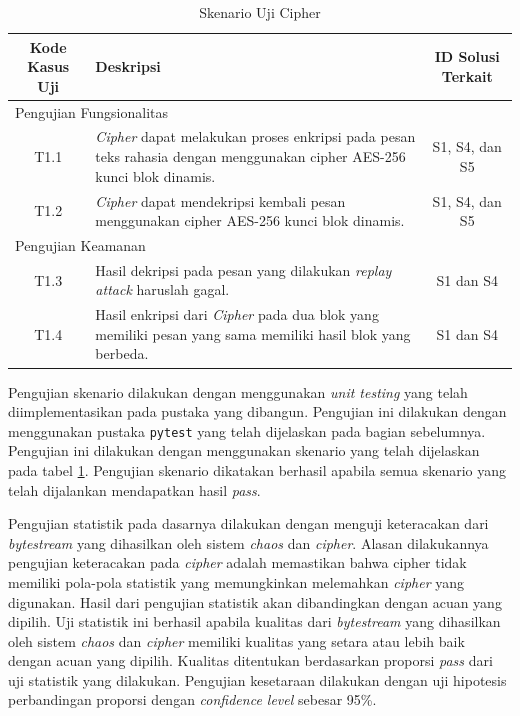 \begin{table}[!h]
  \centering
  \caption{Skenario Uji Cipher} \label{tab:test.case.cipher}
  \begin{tabular}{|c|p{7cm}|c|}
    \hline
    \textbf{Kode Kasus Uji} & \textbf{Deskripsi} & \textbf{ID Solusi Terkait} \\ \hline
    \multicolumn{3}{|l|}{Pengujian Fungsionalitas} \\ \hline
    T1.1 & \emph{Cipher} dapat melakukan proses enkripsi pada pesan teks rahasia dengan menggunakan cipher AES-256 kunci blok dinamis.  & S1, S4, dan S5\\ \hline
    T1.2 & \emph{Cipher} dapat mendekripsi kembali pesan menggunakan cipher AES-256 kunci blok dinamis. & S1, S4, dan S5\\ \hline
    \multicolumn{3}{|l|}{Pengujian Keamanan} \\ \hline
    T1.3 & Hasil dekripsi pada pesan yang dilakukan \emph{replay attack} haruslah gagal. & S1 dan S4\\ \hline
    T1.4 & Hasil enkripsi dari \emph{Cipher} pada dua blok yang memiliki pesan yang sama memiliki hasil blok yang berbeda. & S1 dan S4\\ \hline
  \end{tabular}
\end{table}

Pengujian skenario dilakukan dengan menggunakan \emph{unit testing} yang telah diimplementasikan pada pustaka yang dibangun. Pengujian ini dilakukan dengan menggunakan pustaka \texttt{pytest} yang telah dijelaskan pada bagian sebelumnya. Pengujian ini dilakukan dengan menggunakan skenario yang telah dijelaskan pada tabel \ref{tab:test.case.cipher}. Pengujian skenario dikatakan berhasil apabila semua skenario yang telah dijalankan mendapatkan hasil \emph{pass}.

Pengujian statistik pada dasarnya dilakukan dengan menguji keteracakan dari \emph{bytestream} yang dihasilkan oleh sistem \emph{chaos} dan \emph{cipher}. Alasan dilakukannya pengujian keteracakan pada \emph{cipher} adalah memastikan bahwa cipher tidak memiliki pola-pola statistik yang memungkinkan melemahkan \emph{cipher} yang digunakan. Hasil dari pengujian statistik akan dibandingkan dengan acuan yang dipilih. Uji statistik ini berhasil apabila kualitas dari \emph{bytestream} yang dihasilkan oleh sistem \emph{chaos} dan \emph{cipher} memiliki kualitas yang setara atau lebih baik dengan acuan yang dipilih. Kualitas ditentukan berdasarkan proporsi \emph{pass} dari uji statistik yang dilakukan. Pengujian kesetaraan dilakukan dengan uji hipotesis perbandingan proporsi dengan \emph{confidence level} sebesar 95\%.


